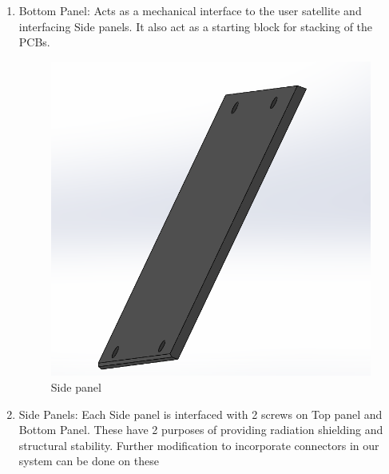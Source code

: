 \documentclass[../../main.tex]{subfiles}
\begin{document}
\begin{enumerate}
\begin{enumerate}
    \item Bottom Panel: Acts as a mechanical interface to the user satellite and interfacing Side panels. It also act as a starting block for stacking of the PCBs.
        \begin{figure}[H]
        \centering
        \includegraphics[scale=0.5]{Figures/Mechanical/side_panel.png}
        \caption{Side panel}
        \label{fig:sys_CAD}
    \end{figure}
    \item Side Panels: Each Side panel is interfaced with 2 screws on Top panel and Bottom Panel. These have 2 purposes of providing radiation shielding and structural stability. Further modification to incorporate connectors in our system can be done on these
    
        
      

    \end{enumerate}   
   \end{enumerate}
   \newpage
\end{document}
